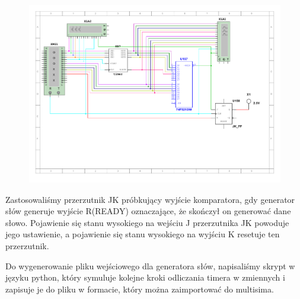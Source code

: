 \documentclass[a4paper]{article}
\begin{document}
\begin{figure}[H]
    \centering
    \includegraphics[width=\textwidth]{general_test.pdf}
\end{figure}

Zastosowaliśmy przerzutnik JK próbkujący wyjście komparatora, gdy generator słów generuje wyjście R(READY)
oznaczające, że skończył on generować dane słowo. Pojawienie się stanu wysokiego na wejściu J przerzutnika JK
powoduje jego ustawienie, a pojawienie się stanu wysokiego na wyjściu K resetuje ten przerzutnik.

Do wygenerowanie pliku wejściowego dla generatora słów, napisaliśmy skrypt w języku python, który 
symuluje kolejne kroki odliczania timera w zmiennych i zapisuje je do pliku w formacie, który można zaimportować 
do multisima.
\end{document}
